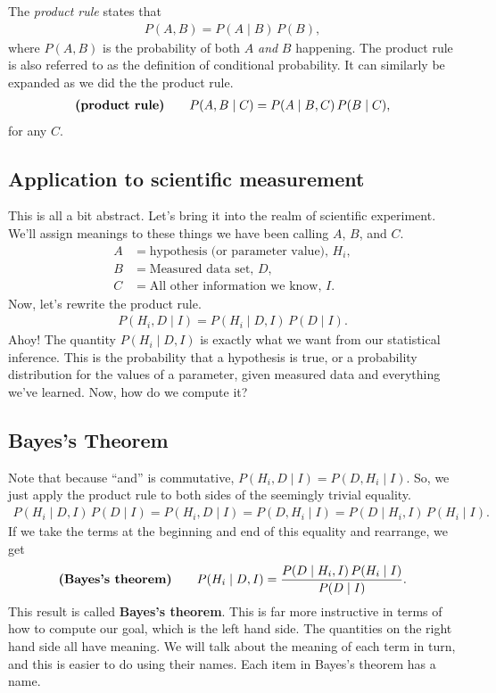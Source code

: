 The \textit{product rule} states that
\begin{align}
  P(A, B) = P(A\mid B)\, P(B),
\end{align}
where $P(A,B)$ is the probability of both $A$ \textit{and} $B$
happening.  The product rule is also referred to as the definition of
conditional probability.  It can similarly be expanded as we did the
the product rule.
\begin{align}
   \text{\textbf{(product rule)}} \qquad P(A, B\mid C) = P(A\mid B, C)\, P(B \mid C),
\end{align}
for any $C$.

\subsection{Application to scientific measurement}
This is all a bit abstract.  Let's bring it into the realm of
scientific experiment.  We'll assign meanings to these things we have
been calling $A$, $B$, and $C$.
\begin{align}
A &= \text{hypothesis (or parameter value), } H_i, \\
B &= \text{Measured data set, } D,\\
C &= \text{All other information we know, } I.
\end{align}
Now, let's rewrite the product rule.
\begin{align}
P(H_i, D\mid I) = P(H_i \mid D, I)\, P(D \mid I).
\end{align}
Ahoy!  The quantity $P(H_i \mid D , I)$ is exactly what we want from
our statistical inference.  This is the probability that a hypothesis
is true, or a probability distribution for the values of a parameter,
given measured data and everything we've learned.  Now, how do we
compute it?


\subsection{Bayes's Theorem}
Note that because ``and'' is commutative,
$P(H_i, D \mid I) = P(D, H_i \mid I)$.  So, we just apply the product
rule to both sides of the seemingly trivial equality.
\begin{align}
  P(H_i \mid D, I)\, P(D \mid I) =  P(H_i, D \mid I) 
  = P(D, H_i \mid I) = P(D \mid H_i, I)\, P(H_i \mid I).
\end{align}
If we take the terms at the beginning and end of this equality and
rearrange, we get
\begin{align}
\text{\textbf{(Bayes's theorem)}} \qquad  P(H_i \mid D, I) = \frac{P(D \mid H_i, I)\, P(H_i \mid I)}{P(D \mid I)}.
\end{align}
This result is called \textbf{Bayes's theorem}.  This is far more
instructive in terms of how to compute our goal, which is the left
hand side.  The quantities on the right hand side all have meaning.
We will talk about the meaning of each term in turn, and this is
easier to do using their names.  Each item in Bayes's theorem has a
name.

